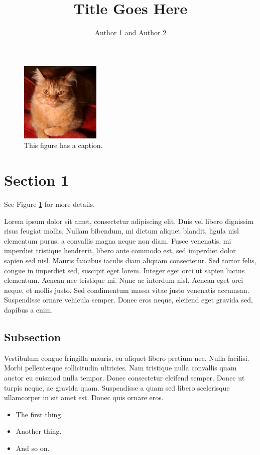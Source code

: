 \documentclass[letterpaper,10pt,twocolumn]{article}
\title{Title Goes Here}
\author{Author 1 and Author 2}
\begin{document}
\maketitle

\begin{figure}
\begin{center}
\includegraphics[width=1.5in]{fritz}
\caption{This figure has a caption.}
\label{fig:f1}
\end{center}
\end{figure}

\section{Section 1}
See Figure \ref{fig:f1} for more details.

Lorem ipsum dolor sit amet, consectetur adipiscing elit. Duis vel libero dignissim risus feugiat mollis. Nullam bibendum, mi dictum aliquet blandit, ligula nisl elementum purus, a convallis magna neque non diam. Fusce venenatis, mi imperdiet tristique hendrerit, libero ante commodo est, sed imperdiet dolor sapien sed nisl. Mauris faucibus iaculis diam aliquam consectetur. Sed tortor felis, congue in imperdiet sed, suscipit eget lorem. Integer eget orci ut sapien luctus elementum. Aenean nec tristique mi. Nunc ac interdum nisl. Aenean eget orci neque, et mollis justo. Sed condimentum massa vitae justo venenatis accumsan. Suspendisse ornare vehicula semper. Donec eros neque, eleifend eget gravida sed, dapibus a enim.

\subsection{Subsection}
Vestibulum congue fringilla mauris, eu aliquet libero pretium nec. Nulla facilisi. Morbi pellentesque sollicitudin ultricies. Nam tristique nulla convallis quam auctor eu euismod nulla tempor. Donec consectetur eleifend semper. Donec ut turpis neque, ac gravida quam. Suspendisse a quam sed libero scelerisque ullamcorper in sit amet est. Donec quis ornare eros.

\begin{itemize}
  \item{The first thing.}
  \item{Another thing.}
  \item{And so on.}
\end{itemize}
\end{document}

